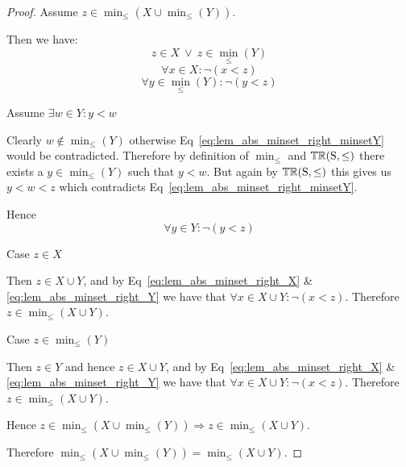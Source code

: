 \documentclass[../Summary.tex]{subfiles}
\begin{document}
\begin{proof}
\vspace{2em}

Assume $z \in \min_\leq(X \cup \min_\leq(Y))$.

\begin{ind}
Then we have:
\begin{equation}
z \in X \ \vee \ z \in \min_\leq(Y)
\end{equation}
\begin{equation} \label{eq:lem_abs_minset_right_X}
\forall x \in X : \neg (x < z)
\end{equation}
\begin{equation} \label{eq:lem_abs_minset_right_minsetY}
\forall y \in \min_\leq(Y) : \neg (y < z)
\end{equation}

Assume $\exists w \in Y : y < w$
\begin{ind}
Clearly $w \notin \min_\leq(Y)$ otherwise Eq~\ref{eq:lem_abs_minset_right_minsetY} would be contradicted. Therefore by definition of $\min_\leq$ and ${\mathbb{TR}}(\mathrm{S, \leq})$ there exists a $y \in \min_\leq(Y)$ such that $y < w$. But again by ${\mathbb{TR}}(\mathrm{S, \leq})$ this gives us $y < w < z$ which contradicts Eq~\ref{eq:lem_abs_minset_right_minsetY}.
\end{ind}
Hence
\begin{equation} \label{eq:lem_abs_minset_right_Y}
\forall y \in Y : \neg (y < z)
\end{equation}

Case $z \in X$
\begin{ind}
Then $z \in X \cup Y$, and by Eq~\ref{eq:lem_abs_minset_right_X} \& \ref{eq:lem_abs_minset_right_Y} we have that $\forall x \in X \cup Y : \neg (x < z)$. Therefore $z \in \min_\leq(X \cup Y)$.
\end{ind}

Case $z \in \min_\leq(Y)$
\begin{ind}
Then $z \in Y$ and hence $z \in X \cup Y$, and by Eq~\ref{eq:lem_abs_minset_right_X} \& \ref{eq:lem_abs_minset_right_Y} we have that $\forall x \in X \cup Y : \neg (x < z)$. Therefore $z \in \min_\leq(X \cup Y)$.
\end{ind}
Hence $z \in \min_\leq(X \cup \min_\leq(Y)) \Rightarrow z \in \min_\leq(X \cup Y)$.
\end{ind}

\vspace{1em}

Therefore $\min_\leq(X \cup \min_\leq(Y)) = \min_\leq(X \cup Y)$. 
\end{proof}
\end{document}
